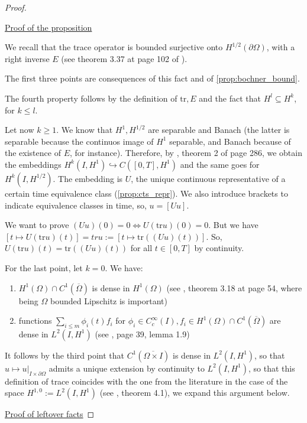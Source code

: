 \documentclass[english,a4paper,12pt,oneside]{scrbook}
\theoremstyle{break}
\newenvironment{mproof}[1][\proofname]{%
  \begin{proof}[#1]$ $\par\nobreak\ignorespaces
}{%
  \end{proof}
}
\renewcommand*{\proofname}{Proof}
\theoremstyle{remark}
\newcommand{\tr}{\text{tr}}
\newcommand{\emb}{\hookrightarrow}
\begin{document}
\begin{mproof}

\underline{Proof of the proposition}

We recall that the trace operator is bounded surjective onto $H^{1/2}(\partial \Omega)$, with a right inverse $E$ (see theorem 3.37 at page 102 of \cite{mclean}).

The first three points are consequences of this fact and of \cref{prop:bochner_bound}.

The fourth property follows by the definition of $\tr, E$ and the fact that $H^l\subseteq H^k$, for $k\leq l$.

Let now $k\geq 1$. We know that $H^1, H^{1/2}$ are separable and Banach (the latter is separable because the continuos image of $H^1$ separable, and Banach because of the existence of $E$, for instance). Therefore, by \cite{evans}, theorem 2 of page 286, we obtain the embeddings $H^k(I,H^1)\emb C([0,T],H^1)$ and the same goes for $H^k(I,H^{1/2})$. The embedding is $U$, the unique continuous representative of a certain time equivalence class (\cref{prop:cts_repr}). We also introduce brackets to indicate equivalence classes in time, so, $u = [Uu]$.

We want to prove $(Uu)(0)=0 \iff U(\tr u)(0)=0$. But we have $[t \mapsto U(\tr u )(t)]=tru:=[t \mapsto \tr((Uu)(t))]$. So, $U(\tr u )(t)=\tr((Uu)(t))$ for all $t\in[0,T]$ by continuity. 

For the last point, let $k=0$. We have:

\begin{enumerate}
\item $H^1(\Omega)\cap C^1(\overline{\Omega})$ is dense in $H^1(\Omega)$ (see \cite{adams}, theorem 3.18 at page 54, where being $\Omega$ bounded Lipschitz is important)
\item functions $\sum_{i\leq m} \phi_i(t)f_i$ for $\phi_i \in C_c^\infty(I), f_i \in H^1(\Omega)\cap C^1(\overline{\Omega})$ are dense in $L^2(I,H^1)$ (see \cite{hinze}, page 39, lemma 1.9)
\end{enumerate}

It follows by the third point that $C^1(\overline{\Omega\times I})$ is dense in $L^2(I,H^1)$, so that $u\mapsto u|_{I\times \partial \Omega}$ admits a unique extension by continuity to $L^2(I,H^1)$, so that this definition of trace coincides with the one from the literature in the case of the space $H^{1,0}:=L^2(I,H^1)$ (see \cite{lions}, theorem 4.1), we expand this argument below.

\underline{Proof of leftover facts}


\end{mproof}
\end{document}
